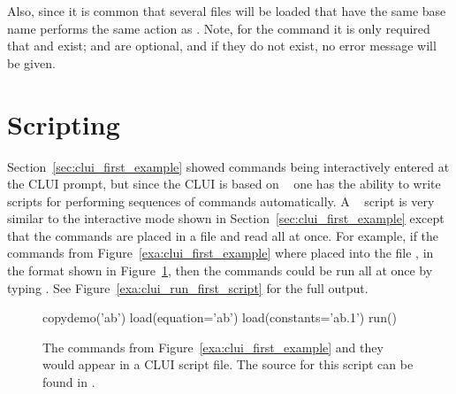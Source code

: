\documentclass[12pt]{report}
\begin{document}
 Also, since it is common that several files will be loaded that
 have the same base name  performs the same 
 action as .  Note, 
 for the command  it is only required that 
  and  exist;   and
  are optional, and if they do not exist,
 no error message will be given.  


 \section{ Scripting }

 Section~\ref{sec:clui_first_example} showed commands
 being interactively entered at the \AUTO CLUI
 prompt, but since the \AUTO CLUI is based 
 on \python~ one has the ability to write
 scripts for performing sequences of commands
 automatically.  A \python~ script is very similar
 to the interactive mode shown in Section~\ref{sec:clui_first_example}
 except that the commands are placed in a file and
 read all at once.  For example, if the
 commands from Figure~\ref{exa:clui_first_example} where placed 
 into the file , in the format shown in 
 Figure~\ref{exa:clui_first_script}, then the commands
 could be run all at once by typing .
 See Figure~\ref{exa:clui_run_first_script} for the
 full output.

 \begin{figure}[htb]
 {\small \begin{center} \begin{boxedverbatim}
 copydemo('ab')
 load(equation='ab')
 load(constants='ab.1')
 run()
 \end{boxedverbatim}
 \end{center} 
 }
 \caption[First example of a \AUTO CLUI script.]
 {The commands from Figure~\ref{exa:clui_first_example}
 and they would appear in a \AUTO CLUI script file.
 The source for this script can be found in .
 }
 \label{exa:clui_first_script}
 \end{figure}
\end{document}
